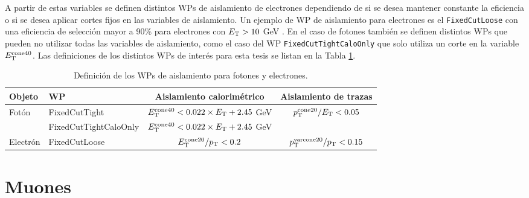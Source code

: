 
A partir de estas variables se definen distintos WPs de aislamiento de electrones dependiendo de si se desea mantener constante la eficiencia o si se desea aplicar cortes fijos en las variables de aislamiento. Un ejemplo de WP de aislamiento para electrones es el \texttt{FixedCutLoose} con una eficiencia de selección mayor a 90\% para electrones con $E_{\text{T}}>10$ GeV \cite{EGAM-2018-01}. En el caso de fotones también se definen distintos WPs que pueden no utilizar todas las variables de aislamiento, como el caso del WP \texttt{FixedCutTightCaloOnly} que solo utiliza un corte en la variable $E_{\text{T}}^{\text{cone40}}$. Las definiciones de los distintos WPs de interés para esta tesis se listan en la Tabla \ref{IDWPs}.



\begin{table} 
\centering
\caption{Definición de los WPs de aislamiento para fotones y electrones. 
}
	\begin{tabular}{ l l c c}

  \hline
  \hline
		Objeto & WP & Aislamiento calorimétrico & Aislamiento de trazas \\

		\hline
		\hline

		Fotón & FixedCutTight & $E_{\text{T}}^{\text{cone40}} < 0.022\times E_{\text{T}} + 2.45$ GeV & $p_{\text{T}}^{\text{cone20}}/E_{\text{T}}<0.05$ \\

		 & FixedCutTightCaloOnly & $E_{\text{T}}^{\text{cone40}} < 0.022\times E_{\text{T}} + 2.45$ GeV &  \\

		\hline

		Electrón & FixedCutLoose & $E_{\text{T}}^{\text{cone20}}/p_{\text{T}}<0.2$ & $p_{\text{T}}^{\text{varcone20}}/p_{\text{T}}<0.15$\\

    \hline
    \hline

	\end{tabular}
\label{IDWPs}
\end{table}








\section{Muones}

